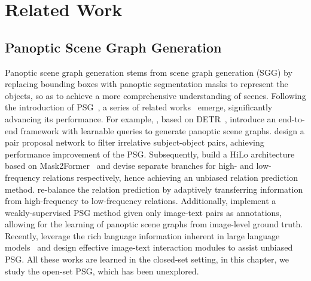 \section{Related Work}
\label{openpsg:sec:related_work}

\subsection{Panoptic Scene Graph Generation}
Panoptic scene graph generation stems from scene graph generation (SGG) by replacing bounding boxes with panoptic segmentation masks to represent the objects, so as to achieve a more comprehensive understanding of scenes.
Following the introduction of PSG~\citep{yang2022panoptic}, a series of related works~\citep{yang2022panoptic, wang2023pair, zhou2023hilo, li2023panoptic, zhao2023textpsg, zhou2025vlprompt} emerge, significantly advancing its performance.
For example, \citet{yang2022panoptic}, based on DETR~\citep{carion2020end}, introduce an end-to-end framework with learnable queries to generate panoptic scene graphs.
\citet{wang2023pair} design a pair proposal network to filter irrelative subject-object pairs, achieving performance improvement of the PSG.
Subsequently, \citet{zhou2023hilo} build a HiLo architecture based on Mask2Former~\citep{cheng2022masked} and devise separate branches for high- and low-frequency relations respectively, hence achieving an unbiased relation prediction method.
\citet{li2023panoptic} re-balance the relation prediction  by adaptively transferring information from high-frequency to low-frequency relations.
Additionally, \citet{zhao2023textpsg} implement a weakly-supervised PSG method given only image-text pairs as annotations, allowing for the learning of panoptic scene graphs from image-level ground truth.
Recently, \citet{zhou2025vlprompt} leverage the rich language information inherent in large language models~\citep{achiam2023gpt} and design effective image-text interaction modules to assist unbiased PSG.
All these works are learned in the closed-set setting, in this chapter, we study the open-set PSG, which has been unexplored.

